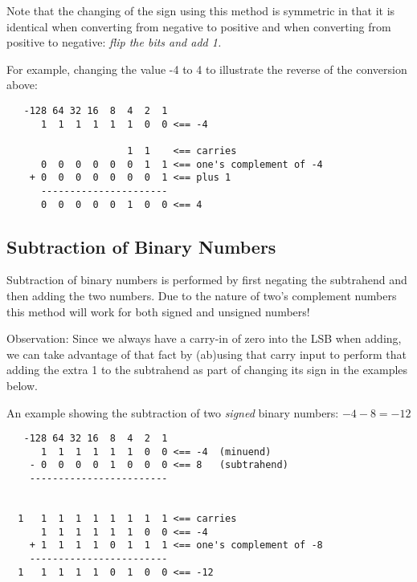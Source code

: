 Note that the changing of the sign using this method is symmetric
in that it is identical when converting from negative to positive
and when converting from positive to negative: {\em flip the bits and
add 1.}

For example, changing the value -4 to 4 to illustrate the
reverse of the conversion above:

\begin{verbatim}
   -128 64 32 16  8  4  2  1
      1  1  1  1  1  1  0  0 <== -4

                     1  1    <== carries
      0  0  0  0  0  0  1  1 <== one's complement of -4
    + 0  0  0  0  0  0  0  1 <== plus 1
      ----------------------
      0  0  0  0  0  1  0  0 <== 4
\end{verbatim}

\subsection{Subtraction of Binary Numbers}


Subtraction%
of binary numbers is performed by first negating
the subtrahend and then adding the two numbers.  Due to the
nature of two's complement numbers this method will work for both 
signed and unsigned numbers!

Observation: Since we always have a carry-in of zero into the LSB when
adding, we can take advantage of that fact by (ab)using that carry input
to perform that adding the extra 1 to the subtrahend as part of
changing its sign in the examples below. 

An example showing the subtraction of two {\em signed} binary numbers: $-4-8 = -12$

\begin{verbatim}
   -128 64 32 16  8  4  2  1
      1  1  1  1  1  1  0  0 <== -4  (minuend)
    - 0  0  0  0  1  0  0  0 <== 8   (subtrahend)
    ------------------------


  1   1  1  1  1  1  1  1  1 <== carries
      1  1  1  1  1  1  0  0 <== -4
    + 1  1  1  1  0  1  1  1 <== one's complement of -8
    ------------------------
  1   1  1  1  1  0  1  0  0 <== -12
\end{verbatim}


